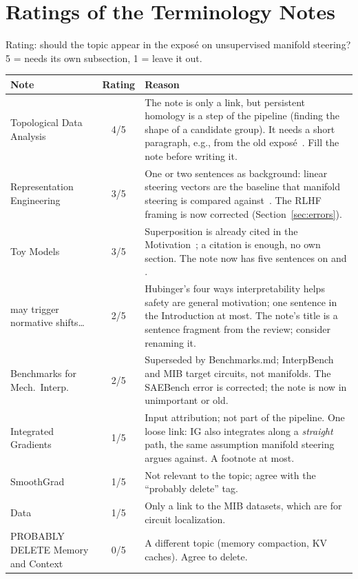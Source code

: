 \documentclass[11pt,a4paper]{article}
\newcommand{\note}[1]{\textsf{#1}}                 %
\begin{document}
\section{Ratings of the Terminology Notes}\label{sec:ratings}
Rating: should the topic appear in the exposé on unsupervised manifold
steering? 5 = needs its own subsection, 1 = leave it out.

\begin{center}
\small
\begin{tabularx}{\textwidth}{@{}l c X@{}}
\toprule
Note & Rating & Reason \\
\midrule
Topological Data Analysis & 4/5 &
  The note is only a link, but persistent homology is a step of the
  pipeline (finding the shape of a candidate group). It needs a short
  paragraph, e.g., from the old exposé~\cite{gardinazzi2024persistent,tauzin2021giotto}.
  Fill the note before writing it. \\
Representation Engineering & 3/5 &
  One or two sentences as background: linear steering vectors are the
  baseline that manifold steering is compared against~\cite{zou2023representation,wurgaft2026manifoldsteering}.
  The RLHF framing is now corrected (Section~\ref{sec:errors}). \\
Toy Models & 3/5 &
  Superposition is already cited in the Motivation~\cite{elhage2022toy}; a
  citation is enough, no own section. The note now has five sentences on
  \textcite{elhage2022toy} and \textcite{prieto2026correlations}. \\
may trigger normative shifts\dots & 2/5 &
  Hubinger's four ways interpretability helps safety are general
  motivation; one sentence in the Introduction at most. The note's title
  is a sentence fragment from the review; consider renaming it. \\
Benchmarks for Mech.\ Interp. & 2/5 &
  Superseded by \note{Benchmarks.md}; InterpBench and MIB target
  circuits, not manifolds. The SAEBench error is corrected; the note is
  now in \note{unimportant or old}. \\
Integrated Gradients & 1/5 &
  Input attribution; not part of the pipeline. One loose link: IG also
  integrates along a \emph{straight} path, the same assumption manifold
  steering argues against. A footnote at most. \\
SmoothGrad & 1/5 &
  Not relevant to the topic; agree with the \enquote{probably delete} tag. \\
Data & 1/5 &
  Only a link to the MIB datasets, which are for circuit localization. \\
PROBABLY DELETE Memory and Context & 0/5 &
  A different topic (memory compaction, KV caches). Agree to delete. \\
\bottomrule
\end{tabularx}
\end{center}
\end{document}
